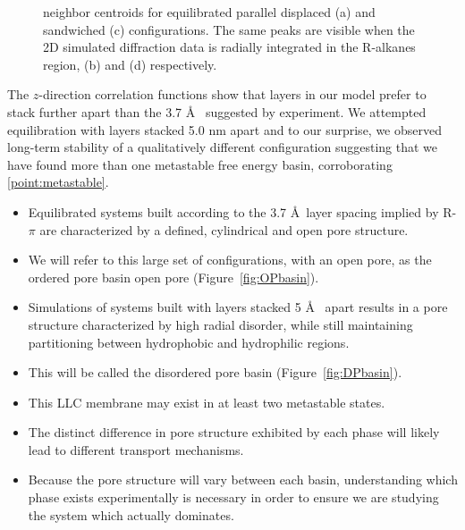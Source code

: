\documentclass{article}
\newcommand{\angstrom}{\textup{\AA}}
\begin{document}
\begin{figure}
{  neighbor centroids for equilibrated parallel displaced (a) and sandwiched (c) configurations. The
  same peaks are visible when the 2D simulated diffraction data is radially integrated in the R-alkanes region,
  (b) and (d) respectively.}~\label{fig:tail_packing}
  \end{figure}

  The $z$-direction correlation functions show that layers in our model prefer
  to stack further apart than the 3.7 \angstrom~ suggested by experiment. We attempted equilibration
  with layers stacked 5.0 nm apart and to our surprise, we observed
  long-term stability of a qualitatively different configuration suggesting
  that we have found more than one metastable free energy basin, corroborating \ref{point:metastable}.
  \begin{itemize}
        \item Equilibrated systems built according to the 3.7 \angstrom~layer spacing
        implied by R-$\pi$ are characterized by a defined, cylindrical and open pore
        structure.
        \item We will refer to this large set of configurations, with an open pore, as
        the ordered pore basin open pore (Figure~\ref{fig:OPbasin}).
        \item Simulations of systems built with layers stacked 5
        \angstrom~ apart results in a pore structure characterized by high radial
        disorder, while still maintaining partitioning between hydrophobic and
        hydrophilic regions.
        \item This will be called the disordered pore basin (Figure~\ref{fig:DPbasin}).
        \item This LLC membrane may exist in at least two metastable states.
        \item The distinct difference in pore structure exhibited by each phase will
        likely lead to different transport mechanisms.
        \item Because the pore structure will vary between each basin, understanding
        which phase exists experimentally is necessary in order to ensure we are
        studying the system which actually dominates.
  \end{itemize}
\end{document}
